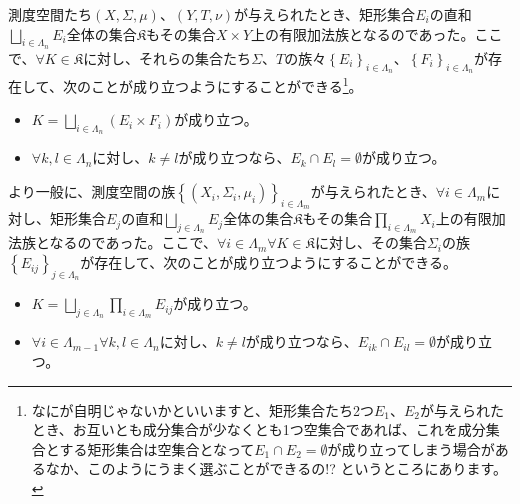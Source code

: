 \documentclass[dvipdfmx]{jsarticle}
\begin{document}
\begin{thm}\label{4.5.7.3}
測度空間たち$(X,\varSigma,\mu)$、$(Y,T,\nu)$が与えられたとき、矩形集合$E_{i}$の直和$\bigsqcup_{i \in \varLambda_{n}} E_{i}$全体の集合$\mathfrak{K}$もその集合$X \times Y$上の有限加法族となるのであった。ここで、$\forall K \in \mathfrak{K}$に対し、それらの集合たち$\varSigma$、$T$の族々$\left\{ E_{i} \right\}_{i \in \varLambda_{n}}$、$\left\{ F_{i} \right\}_{i \in \varLambda_{n}}$が存在して、次のことが成り立つようにすることができる\footnote{なにが自明じゃないかといいますと、矩形集合たち2つ$E_{1}$、$E_{2}$が与えられたとき、お互いとも成分集合が少なくとも1つ空集合であれば、これを成分集合とする矩形集合は空集合となって$E_{1} \cap E_{2} = \emptyset$が成り立ってしまう場合があるなか、このようにうまく選ぶことができるの!? というところにあります。}。
\begin{itemize}
\item
  $K = \bigsqcup_{i \in \varLambda_{n}} \left( E_{i} \times F_{i} \right)$が成り立つ。
\item
  $\forall k,l \in \varLambda_{n}$に対し、$k \neq l$が成り立つなら、$E_{k} \cap E_{l} = \emptyset$が成り立つ。
\end{itemize}\par
より一般に、測度空間の族$\left\{ \left( X_{i},\varSigma_{i},\mu_{i} \right) \right\}_{i \in \varLambda_{m}}$が与えられたとき、$\forall i \in \varLambda_{m}$に対し、矩形集合$E_{j}$の直和$\bigsqcup_{j \in \varLambda_{n}} E_{j}$全体の集合$\mathfrak{K}$もその集合$\prod_{i \in \varLambda_{m}} X_{i}$上の有限加法族となるのであった。ここで、$\forall i \in \varLambda_{m}\forall K \in \mathfrak{K}$に対し、その集合$\varSigma_{i}$の族$\left\{ E_{ij} \right\}_{j \in \varLambda_{n}}$が存在して、次のことが成り立つようにすることができる。
\begin{itemize}
\item
  $K = \bigsqcup_{j \in \varLambda_{n}} {\prod_{i \in \varLambda_{m}} E_{ij}}$が成り立つ。
\item
  $\forall i \in \varLambda_{m - 1}\forall k,l \in \varLambda_{n}$に対し、$k \neq l$が成り立つなら、$E_{ik} \cap E_{il} = \emptyset$が成り立つ。
\end{itemize}
\end{thm}
\end{document}
